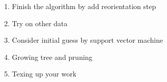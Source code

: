 \documentclass{article}
\begin{document}
\begin{enumerate} 
\item Finish the algorithm by add reorientation step 
\item Try on other data
\item Consider initial guess by support vector machine
\item Growing tree and pruning 
\item Texing up your work 
\end{enumerate} 
\end{document}
